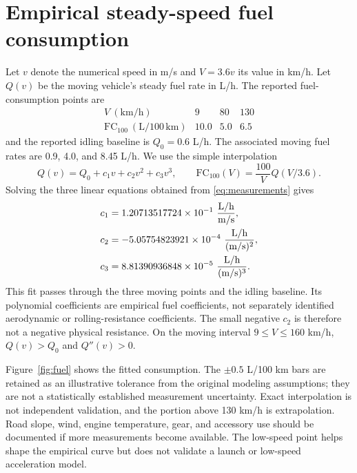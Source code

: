 \documentclass[10pt,a4paper]{article}
\begin{document}
\section{Empirical steady-speed fuel consumption}
\label{sec:fuel}
Let $v$ denote the numerical speed in m/s and $V=3.6v$ its value in km/h. Let $Q(v)$ be the moving vehicle's steady fuel rate in L/h. The reported fuel-consumption points are
\begin{equation}
\begin{array}{c|ccc}
V\ (\mathrm{km/h}) & 9 & 80 & 130\\ \hline
\mathrm{FC}_{100}\ (\mathrm{L/100\,km}) & 10.0 & 5.0 & 6.5
\end{array}
\label{eq:measurements}
\end{equation}
and the reported idling baseline is $Q_0=0.6$ L/h. The associated moving fuel rates are 0.9, 4.0, and 8.45 L/h. We use the simple interpolation
\begin{equation}
Q(v)=Q_0+c_1v+c_2v^2+c_3v^3,
\qquad
\mathrm{FC}_{100}(V)=\frac{100}{V}Q(V/3.6).
\label{eq:Qfit}
\end{equation}
Solving the three linear equations obtained from \eqref{eq:measurements} gives
\begin{align}
c_1&=1.20713517724\times10^{-1}\ \frac{\mathrm{L/h}}{\mathrm{m/s}},\notag\\
c_2&=-5.05754823921\times10^{-4}\ \frac{\mathrm{L/h}}{(\mathrm{m/s})^2},\notag\\
c_3&=8.81390936848\times10^{-5}\ \frac{\mathrm{L/h}}{(\mathrm{m/s})^3}.
\label{eq:fitcoeff}
\end{align}
This fit passes through the three moving points and the idling baseline. Its polynomial coefficients are empirical fuel coefficients, not separately identified aerodynamic or rolling-resistance coefficients. The small negative $c_2$ is therefore not a negative physical resistance. On the moving interval $9\le V\le160$ km/h, $Q(v)>Q_0$ and $Q''(v)>0$.

Figure~\ref{fig:fuel} shows the fitted consumption. The $\pm0.5$ L/100 km bars are retained as an illustrative tolerance from the original modeling assumptions; they are not a statistically established measurement uncertainty. Exact interpolation is not independent validation, and the portion above 130 km/h is extrapolation. Road slope, wind, engine temperature, gear, and accessory use should be documented if more measurements become available. The low-speed point helps shape the empirical curve but does not validate a launch or low-speed acceleration model.
\end{document}
